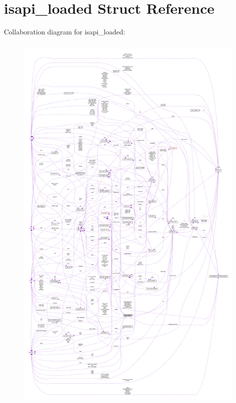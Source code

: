 \hypertarget{structisapi__loaded}{}\section{isapi\+\_\+loaded Struct Reference}
\label{structisapi__loaded}


Collaboration diagram for isapi\+\_\+loaded\+:
\nopagebreak
\begin{figure}[H]
\begin{center}
\leavevmode
\includegraphics[height=550pt]{structisapi__loaded__coll__graph}
\end{center}
\end{figure}
